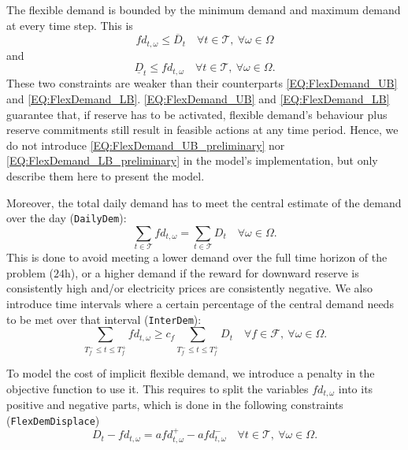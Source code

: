 The flexible demand is bounded by the minimum demand and maximum demand at every time step. This is
\begin{equation} \label{EQ:FlexDemand_UB_preliminary}
	fd_{t, \omega} \leq \overline{D}_t \quad \forall t \in \mathcal{T}, \ \forall \omega \in \Omega
\end{equation}
and 
\begin{equation} \label{EQ:FlexDemand_LB_preliminary}
	\underline{D}_t \leq fd_{t, \omega} \quad \forall t \in \mathcal{T}, \ \forall \omega \in \Omega.
\end{equation}
These two constraints are weaker than their counterparts \eqref{EQ:FlexDemand_UB} and \eqref{EQ:FlexDemand_LB}. \eqref{EQ:FlexDemand_UB} and \eqref{EQ:FlexDemand_LB} guarantee that, if reserve has to be activated, flexible demand's behaviour plus reserve commitments still result in feasible actions at any time period. Hence, we do not introduce \eqref{EQ:FlexDemand_UB_preliminary} nor \eqref{EQ:FlexDemand_LB_preliminary} in the model's implementation, but only describe them here to present the model.

Moreover, the total daily demand has to meet the central estimate of the demand over the day (\verb|DailyDem|): 
\begin{equation} \label{EQ:DailyDem}
	\sum_{t \in \mathcal{T}} fd_{t, \omega} = \sum_{t \in \mathcal{T}} D_t \quad \forall \omega \in \Omega.
\end{equation}
This is done to avoid meeting a lower demand over the full time horizon of the problem ($24$h), or a higher demand if the reward for downward reserve is consistently high and/or electricity prices are consistently negative. We also introduce time intervals where a certain percentage of the central demand needs to be met over that interval (\verb|InterDem|):
\begin{equation} \label{EQ:InterDem}
	\sum_{T_f^- \leq t \leq T_f^+} fd_{t, \omega} \geq c_f \sum_{T_f^- \leq t \leq T_f^+} D_t \quad \forall f \in \mathcal{F}, \ \forall \omega \in \Omega.
\end{equation}

To model the cost of implicit flexible demand, we introduce a penalty in the objective function to use it. This requires to split the variables $fd_{t, \omega}$ into its positive and negative parts, which is done in the following constraints (\verb|FlexDemDisplace|)
\begin{equation} \label{EQ:FlexDemDisplace}
	D_t - fd_{t, \omega} = afd_{t, \omega}^+ - afd_{t, \omega}^- \quad \forall t \in \mathcal{T}, \ \forall \omega \in \Omega.
\end{equation}


